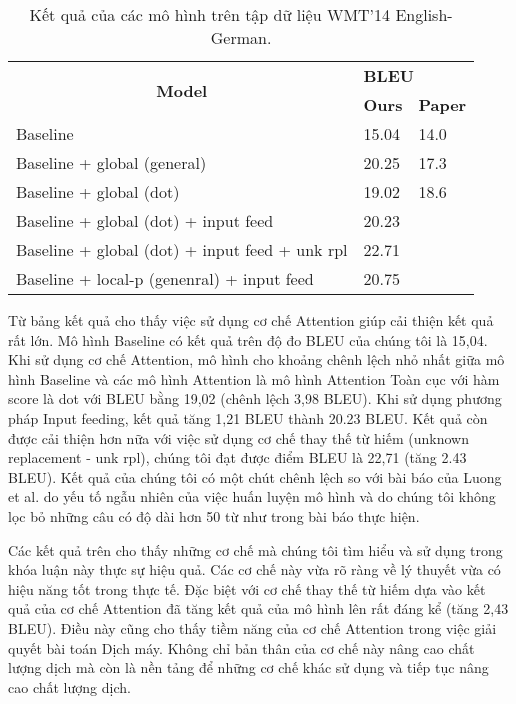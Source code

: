 \begin{table}[]
	\centering
	\begin{tabular}{|l|l|l|}
		\hline
		\multicolumn{1}{|c|}{\multirow{2}{*}{\textbf{Model}}} & \multicolumn{2}{l|}{\textbf{BLEU}} \\ \cline{2-3} 
		\multicolumn{1}{|c|}{}                                & \textbf{Ours}   & \textbf{Paper}   \\ \hline
		Baseline                                              & 15.04           & 14.0             \\ \hline
		Baseline + global (general)                           & 20.25           & 17.3             \\ \hline
		Baseline + global (dot)                               & 19.02           & 18.6             \\ \hline
		Baseline + global (dot) + input feed                  & 20.23           &                  \\ \hline
		Baseline + global (dot) + input feed + unk rpl        & 22.71           &                  \\ \hline
		Baseline + local-p (genenral) + input feed            & 20.75           &                  \\ \hline
	\end{tabular}
	\caption{Kết quả của các mô hình trên tập dữ liệu WMT'14 English-German.}
	\label{wmt14-results}
\end{table}
Từ bảng kết quả cho thấy việc sử dụng cơ chế Attention giúp cải thiện kết quả rất lớn. Mô hình Baseline có kết quả trên độ đo BLEU của chúng tôi là 15,04. Khi sử dụng cơ chế Attention, mô hình cho khoảng chênh lệch nhỏ nhất giữa mô hình Baseline và các mô hình Attention là mô hình Attention Toàn cục với hàm score là dot với BLEU bằng 19,02 (chênh lệch 3,98 BLEU). Khi sử dụng phương pháp Input feeding, kết quả tăng 1,21 BLEU thành 20.23 BLEU. Kết quả còn được cải thiện hơn nữa với việc sử dụng cơ chế thay thế từ hiếm (unknown replacement - unk rpl), chúng tôi đạt được điểm BLEU là 22,71 (tăng 2.43 BLEU). Kết quả của chúng tôi có một chút chênh lệch so với bài báo của Luong et al. \cite{attentionThangLuong2015} do yếu tố ngẫu nhiên của việc huấn luyện mô hình và do chúng tôi không lọc bỏ những câu có độ dài hơn 50 từ như trong bài báo thực hiện.

Các kết quả trên cho thấy những cơ chế mà chúng tôi tìm hiểu và sử dụng trong khóa luận này thực sự hiệu quả. Các cơ chế này vừa rõ ràng về lý thuyết vừa có hiệu năng tốt trong thực tế. Đặc biệt với cơ chế thay thế từ hiếm dựa vào kết quả của cơ chế Attention đã tăng kết quả của mô hình lên rất đáng kể (tăng 2,43 BLEU). Điều này cũng cho thấy tiềm năng của cơ chế Attention trong việc giải quyết bài toán Dịch máy. Không chỉ bản thân của cơ chế này nâng cao chất lượng dịch mà còn là nền tảng để những cơ chế khác sử dụng và tiếp tục nâng cao chất lượng dịch.
